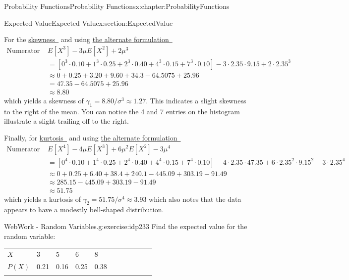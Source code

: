 \documentclass[oneside,10pt,]{book}
\newcommand{\tabularfont}{\relax}
\newcommand{\xreffont}{\relax}
\numberwithin{equation}{section}
\newcommand{\hrulemedium}{\noalign{\hrule height 0.07em}}
\begin{document}
\begin{chapterptx}{Probability Functions}{}{Probability Functions}{}{}{x:chapter:ProbabilityFunctions}
\begin{sectionptx}{Expected Value}{}{Expected Value}{}{}{x:section:ExpectedValue}
\par
For the \hyperlink{x:li:TheoreticalSkewness}{skewness~{\xreffont 3}} and using \hyperlink{x:li:TheoreticalMeasuresAlternatesSkew}{the alternate formulation~{\xreffont 2}}%
\begin{align*}
\text{Numerator = } & E[X^3] - 3 \mu E[X^2] + 2\mu^3\\
& = \left [ 0^3 \cdot 0.10 + 1^3 \cdot 0.25 + 2^3 \cdot 0.40 + 4^3 \cdot 0.15 + 7^3 \cdot 0.10 \right ] - 3 \cdot 2.35 \cdot 9.15 + 2 \cdot 2.35^3\\
& \approx 0 + 0.25 + 3.20 + 9.60 + 34.3 - 64.5075 + 25.96\\
& = 47.35 - 64.5075 + 25.96\\
& \approx 8.80
\end{align*}
which yields a skewness of \(\gamma_1 = 8.80 / \sigma^3 \approx 1.27 \). This indicates a slight skewness to the right of the mean. You can notice the 4 and 7 entries on the histogram illustrate a slight trailing off to the right.%
\par
Finally, for \hyperlink{x:li:TheoreticalKurtosis}{kurtosis~{\xreffont 4}} and using \hyperlink{x:li:TheoreticalMeasuresAlternatesKurt}{the alternate formulation~{\xreffont 3}}%
\begin{align*}
\text{Numerator = } & E[X^4] - 4 \mu E[X^3] + 6 \mu^2 E[X^2] - 3\mu^4\\
& = \left [ 0^4 \cdot 0.10 + 1^4 \cdot 0.25 + 2^4 \cdot 0.40 + 4^4 \cdot 0.15 + 7^4 \cdot 0.10 \right ] - 4 \cdot 2.35 \cdot 47.35 + 6 \cdot 2.35^2 \cdot 9.15^2 - 3 \cdot 2.35^4\\
& \approx 0 + 0.25 + 6.40 + 38.4 + 240.1 - 445.09 + 303.19 - 91.49\\
& \approx 285.15 - 445.09 + 303.19 - 91.49\\
& \approx 51.75
\end{align*}
which yields a kurtosis of \(\gamma_2 = 51.75 / \sigma^4 \approx 3.93\) which also notes that the data appears to have a modestly bell-shaped distribution.%
\begin{inlineexercise}{WebWork - Random Variables.}{g:exercise:idp233}%
Find the expected value for the random variable:%
\begin{sidebyside}{1}{0}{0}{0}%
\begin{sbspanel}{1}%
{\centering%
{\tabularfont%
\begin{tabular}{BlBlBlBlBlB}\hrulemedium
\(X\)&3&5&6&8\tabularnewline\hrulemedium
\(P(X)\)&0.21&0.16&0.25&0.38\tabularnewline\hrulemedium
\end{tabular}
}}
\end{sbspanel}
\end{sidebyside}
\end{inlineexercise}
\end{sectionptx}
\end{chapterptx}
\end{document}
